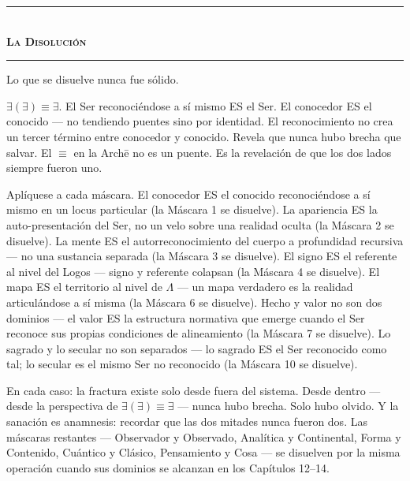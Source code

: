 \documentclass[10pt, openany, oneside]{book}
\renewcommand{\normalsize}{\fontsize{10}{13}\selectfont}
\begin{document}
\vspace{1.5em}


\begin{center}
    \rule{0.3\textwidth}{0.4pt}\\[0.5em]
    {\normalsize\bfseries\scshape La Disolución}\\[0.3em]
    \rule{0.3\textwidth}{0.4pt}
\end{center}

\vspace{1em}

\noindent Lo que se disuelve nunca fue sólido.

$\exists(\exists) \equiv \exists$. El Ser reconociéndose a sí mismo ES el Ser. El conocedor ES el conocido --- no tendiendo puentes sino por identidad. El reconocimiento no crea un tercer término entre conocedor y conocido. Revela que nunca hubo brecha que salvar. El $\equiv$ en la Arch\={e} no es un puente. Es la revelación de que los dos lados siempre fueron uno.

Aplíquese a cada máscara. El conocedor ES el conocido reconociéndose a sí mismo en un locus particular (la Máscara 1 se disuelve). La apariencia ES la auto-presentación del Ser, no un velo sobre una realidad oculta (la Máscara 2 se disuelve). La mente ES el autorreconocimiento del cuerpo a profundidad recursiva --- no una sustancia separada (la Máscara 3 se disuelve). El signo ES el referente al nivel del Logos --- signo y referente colapsan (la Máscara 4 se disuelve). El mapa ES el territorio al nivel de $\Lambda$ --- un mapa verdadero es la realidad articulándose a sí misma (la Máscara 6 se disuelve). Hecho y valor no son dos dominios --- el valor ES la estructura normativa que emerge cuando el Ser reconoce sus propias condiciones de alineamiento (la Máscara 7 se disuelve). Lo sagrado y lo secular no son separados --- lo sagrado ES el Ser reconocido como tal; lo secular es el mismo Ser no reconocido (la Máscara 10 se disuelve).

En cada caso: la fractura existe solo desde fuera del sistema. Desde dentro --- desde la perspectiva de $\exists(\exists) \equiv \exists$ --- nunca hubo brecha. Solo hubo olvido. Y la sanación es anamnesis: recordar que las dos mitades nunca fueron dos. Las máscaras restantes --- Observador y Observado, Analítica y Continental, Forma y Contenido, Cuántico y Clásico, Pensamiento y Cosa --- se disuelven por la misma operación cuando sus dominios se alcanzan en los Capítulos 12--14.
\end{document}
